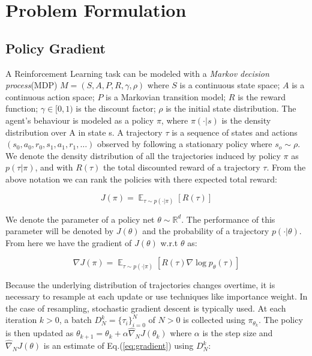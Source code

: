 \section{Problem Formulation}
\label{section:problem}

\subsection{Policy Gradient}
\label{section:pg}


A Reinforcement Learning task can be modeled with a \emph{Markov decision process}(MDP) $M=\left(S,A,P,R,\gamma,\rho \right)$ where $S$ is a continuous state space; $A$ is a continuous action space; $P$ is a Markovian transition model; $R$ is the reward function; $\gamma \in [0, 1)$
is the discount factor; $\rho$ is the initial state distribution. The agent’s behaviour is modeled as a policy $\pi$, where $\pi(\cdot|s)$ is the density distribution over A in state s. A trajectory $\tau$ is a sequence of states and actions $\left(s_0,a_0,r_0,s_1,a_1,r_1,\ldots\right)$ observed by following a stationary policy where $s_o \sim \rho$. We denote the density distribution of all the trajectories induced by policy $\pi$ as $p(\tau|\pi)$, and with $R(\tau)$ the total discounted reward of a trajectory $\tau$. From the above notation we can rank the policies with there expected total reward:

\begin{equation}
  \label{eq:expectedreward}
  J\left(\pi\right)=\mathop{{}\mathbb{E}}_{\tau \sim p(\cdot|\pi)}\left[R(\tau)\right]
\end{equation}

We denote the parameter of a policy net $\theta \sim \mathbb{R}^d$. The performance of this parameter will be denoted by $J(\theta)$ and the probability of a trajectory $p(\cdot|\theta)$. From here we have the gradient of $J(\theta)$ w.r.t $\theta$ as:

\begin{equation}
  \label{eq:gradient}
  \nabla J\left(\pi\right)=\mathop{{}\mathbb{E}}_{\tau \sim p(\cdot|\pi)}\left[R(\tau) \nabla \log{p_\theta(\tau)} \right]
\end{equation}

Because the underlying distribution of trajectories changes overtime, it is necessary to resample at each update or use techniques like importance weight. In the case of resampling, stochastic gradient descent is typically used. At each iteration $k > 0$, a batch $D_N^k=\{\tau_i\}_{i=0}^N$ of $N > 0$ is collected using $\pi_{\theta_k}$. The policy is then updated as $\theta_{k+1}=\theta_k + \alpha \widehat{\nabla}_N J(\theta_k)$ where $\alpha$ is the step size and $\widehat{\nabla}_N J(\theta)$ is an estimate of Eq.(\ref{eq:gradient}) using $D_N^k$:

